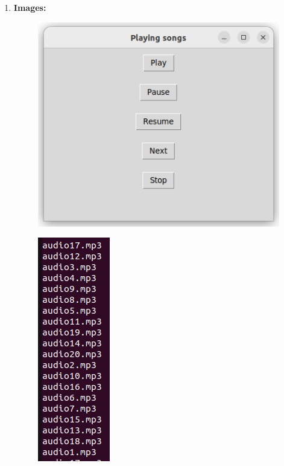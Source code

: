 \documentclass[12pt, journal]{IEEEtran}
\begin{document}
\begin{enumerate}[label=(\roman*)]
		\item \textbf{Images:}
			\begin{figure}[ht]
				\includegraphics[scale=0.5]{images/1.png}
				\label{IMG1}
			\end{figure}
			\begin{figure}[ht]
				\includegraphics{images/2.png}
				\label{IMG2}
			\end{figure}
		\end{enumerate}		
\end{document}
